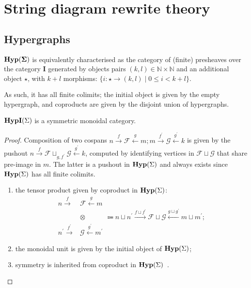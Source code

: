 \section{String diagram rewrite theory}
\label{sec:appendix:hyp}

\subsection{Hypergraphs}

\begin{proposition}
$\mathbf{Hyp(\Sigma)}$ is equivalently characterised as the category of (finite) presheaves over the category $\mathbf{I}$ generated by objects pairs $(k, l) \in \mathbb{N} \times \mathbb{N}$ and an additional object $\star$, with $k + l$ morphisms: $\{ i\colon \star \to (k, l) \mid 0 \leq i < k + l \}$.
\end{proposition}
As such, it has all finite colimits; the initial object is given by the empty hypergraph, and coproducts are given by the disjoint union of hypergraphs.

\begin{proposition}
	$\textbf{HypI}(\Sigma)$ is a symmetric monoidal category.
\end{proposition}
\begin{proof}
Composition of two cospans $n \xrightarrow{f} \mathcal{F} \xleftarrow{g} m;m \xrightarrow{f^\prime} \mathcal{G} \xleftarrow{g^\prime} k$ is given by the pushout
$
	n \xrightarrow{f} \mathcal{F} \sqcup_{g,f^\prime} \mathcal{G} \xleftarrow{g^\prime} k
$,
computed by identifying vertices in $\mathcal{F} \sqcup \mathcal{G}$ that share pre-image in $m$.
The latter is a pushout in $\mathbf{Hyp}(\Sigma)$ and always exists since $\mathbf{Hyp}(\Sigma)$ has all finite colimits.
	\begin{enumerate}
	\item the tensor product given by coproduct in $\mathbf{Hyp}(\Sigma)$:
	      \begin{align*}
		      n \xrightarrow{f}               & \mathcal{F} \xleftarrow{g} m                                                                                                                                       \\
		                                      & \otimes \qquad \quad \Coloneqq n \sqcup n^\prime \xrightarrow{f \sqcup f^\prime} \mathcal{F} \sqcup \mathcal{G} \xleftarrow{g \sqcup g^\prime} m \sqcup m^\prime ; \\
		      n^\prime \xrightarrow{f^\prime} & \mathcal{G} \xleftarrow{g^\prime} m^\prime
	      \end{align*}
	\item the monoidal unit is given by the initial object of $\mathbf{Hyp}(\Sigma)$;
	\item symmetry is inherited from coproduct in $\mathbf{Hyp}(\Sigma)$~\cite{MonoidalCoproduct}.
\end{enumerate}
\end{proof}

